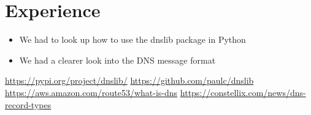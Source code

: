\documentclass[11pt]{article}
\begin{document}
\section{Experience}
    \begin{itemize}
        \item We had to look up how to use the dnslib package in Python
        \item We had a clearer look into the DNS message format
    \end{itemize}

\begin{thebibliography}{1}
     \url{https://pypi.org/project/dnslib/}
     \url{https://github.com/paulc/dnslib}
     \url{https://aws.amazon.com/route53/what-is-dns}
     \url{https://constellix.com/news/dns-record-types}
\end{thebibliography}
\end{document}
